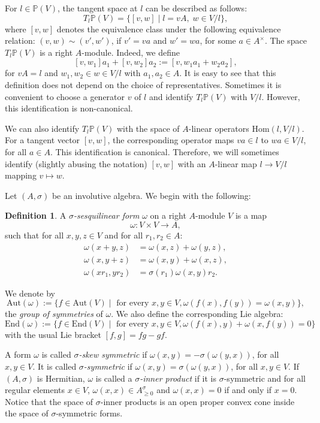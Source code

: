 \documentclass[oneside,11pt]{amsart}
\theoremstyle{definition}
\newtheorem{defn}[thm]{Definition}
\theoremstyle{remark}
\numberwithin{thm}{section}
\numberwithin{equation}{section}
\begin{document}
For $l\in\mathbb P(V)$, the tangent space at $l$ can be described as follows:
\begin{equation}\label{eq:projective.tangent}
    T_l\mathbb P(V)=\{[v,w]\mid l=vA,\; w\in V/l\},    
\end{equation}
where $[v,w]$ denotes the equivalence class under the following equivalence relation: $(v,w)\sim (v',w')$, if $v'=va$ and $w'=wa$, for some $a\in A^\times$. The space $T_l\mathbb{P}(V)$ is a right $A$-module. Indeed, we define 
$$
[v,w_1]a_1+[v,w_2]a_2:=[v,w_1a_1+w_2a_2],
$$ 
for $vA=l$ and $w_1,w_2\in w\in V/l$ with $a_1,a_2\in A$. It is easy to see that this definition does not depend on the choice of representatives. Sometimes it is convenient to choose a generator $v$ of $l$ and identify $T_l\mathbb P(V)$ with $V/l$. However, this identification is non-canonical.

We can also identify $T_l\mathbb P(V)$ with the space of $A$-linear operators $\mathrm{Hom}(l,V/l)$. For a tangent vector $[v,w]$, the corresponding operator maps $va\in l$ to $wa\in V/l$, for all $a\in A$. This identification is canonical. Therefore, we will sometimes identify (slightly abusing the notation) $[v,w]$ with an $A$-linear map $l\to V/l$ mapping $v\mapsto w$.

Let $(A,\sigma)$ be an involutive algebra. We begin with the following:

\begin{defn}\label{osp}
A \emph{$\sigma$-sesquilinear form} $\omega$ on a right $A$-module $V$ is a map
$$\omega\colon V\times V\to A,$$
such that for all $x,y,z\in V$ and for all $r_1,r_2\in A$:
\begin{align*} \omega(x+y,z) & =\omega(x,z)+\omega(y,z),\\
\omega(x,y+z) & =\omega(x,y)+\omega(x,z),\\
\omega(xr_1,yr_2) & =\sigma(r_1)\omega(x,y)r_2.
\end{align*}

\noindent We denote by $$\mathrm{Aut}(\omega):=\{f\in\mathrm{Aut}(V)\mid \text{ for every } x,y\in V, \omega(f(x),f(y))=\omega(x,y)\},$$ the \emph{group of symmetries} of $\omega$. We also define the corresponding Lie algebra:
$$\mathrm{End}(\omega):=\{f\in\mathrm{End}(V)\mid \text{ for every } x,y\in V,\omega(f(x),y)+\omega(x,f(y))=0\}$$
with the usual Lie bracket $[f,g]=fg-gf$.
\end{defn}

A form $\omega$ is called \emph{$\sigma$-skew symmetric} if $\omega(x,y)=-\sigma(\omega(y,x))$, for all $x,y\in V$.
It is called \emph{$\sigma$-symmetric} if $\omega(x,y)=\sigma(\omega(y,x))$, for all $x,y\in V$. If $(A,\sigma)$ is Hermitian, $\omega$ is called a \emph{$\sigma$-inner product} if it is $\sigma$-symmetric and for all regular elements $x\in V$, $\omega(x,x)\in A^\sigma_{\geq 0}$ and $\omega(x,x)=0$ if and only if $x=0$. Notice that the space of $\sigma$-inner products is an open proper convex cone inside the space of $\sigma$-symmetric forms.
\end{document}
